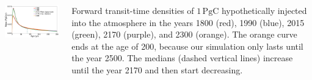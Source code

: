\begin{columns}
	\setlength{\lc}{0.5\textwidth}
	\begin{column}{\lc}
	  \begin{center}
      \includegraphics[width=\linewidth]{images/content/ftt.pdf}
	  \end{center}
	\end{column}
	\setlength{\rc}{\the\dimexpr (\textwidth-\lc) \relax }
	\begin{column}{\rc}
    \begin{minipage}{0.95\rc}
    Forward transit-time densities of $1\, \text{PgC}$ %
      hypothetically injected into the atmosphere in the years 1800 (red), 1990 (blue), 2015 (green), 2170 (purple), and 2300 (orange).
      The orange curve ends at the age of 200, because our simulation only lasts until the year 2500.
      The medians (dashed vertical lines) increase until the year 2170 and then start decreasing.
      \label{fig:ftt}
    \end{minipage}
	\end{column}
\end{columns}
